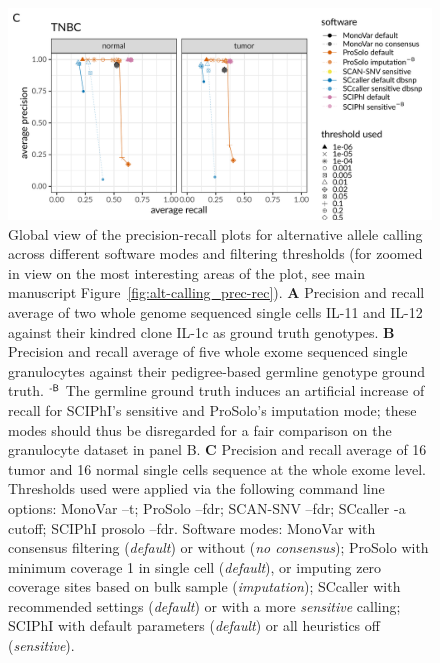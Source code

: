 \documentclass[authoryear,preprint,11pt]{scrartcl}
\begin{document}
\begin{figure}[!tpb]
\begin{minipage}{.9\linewidth}
  \includegraphics[height=42ex]{figs/Wang2014/Wang2014_prosolo-monovar-scansnv-sccaller-scvilp_precision-recall-plot.pdf} \newline
 \end{minipage}
 \caption{
  Global view of the precision-recall plots for alternative allele calling across different software modes and filtering thresholds (for zoomed in view on the most interesting areas of the plot, see main manuscript Figure~\ref{fig:alt-calling_prec-rec}).
  \textbf{A} Precision and recall average of two whole genome sequenced single cells IL-11 and IL-12 against their kindred clone IL-1c as ground truth genotypes.
  \textbf{B} Precision and recall average of five whole exome sequenced single granulocytes against their pedigree-based germline genotype ground truth.\newline 
  $^\text{\sffamily-B}$ The germline ground truth induces an artificial increase of recall for SCIPhI's sensitive and ProSolo's imputation mode; these modes should thus be disregarded for a fair comparison on the granulocyte dataset in panel B.\newline
  \textbf{C} Precision and recall average of 16 tumor and 16 normal single cells sequence at the whole exome level. \newline \footnotesize
  Thresholds used were applied via the following command line options:
  MonoVar {\ttfamily --t};
  ProSolo {\ttfamily --fdr};
  SCAN-SNV {\ttfamily --fdr};
  SCcaller {\ttfamily -a cutoff};
  SCIPhI {\ttfamily prosolo --fdr}.
  Software modes:
  MonoVar with consensus filtering ({\itshape default}) or without ({\itshape no consensus});
  ProSolo with minimum coverage 1 in single cell ({\itshape default}), or imputing zero coverage sites based on bulk sample ({\itshape imputation});
  SCcaller with recommended settings ({\itshape default}) or with a more {\itshape sensitive} calling;
  SCIPhI with default parameters ({\itshape default}) or all heuristics off ({\itshape sensitive}).
  }
 \label{fig:alt-calling_prec-rec_global}
\end{figure}
\end{document}
